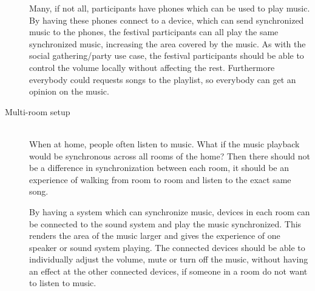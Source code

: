 \begin{description}
        Many, if not all, participants have phones which can be used to play music.
        By having these phones connect to a device, which can send synchronized music to the phones,
        the festival participants can all play the same synchronized music,
        increasing the area covered by the music.
        As with the social gathering/party use case,
        the festival participants should be able to control the volume locally without affecting the rest.
        Furthermore everybody could requests songs to the playlist, so everybody can get an opinion on the music.

    \item[Multi-room setup] \hfill\\
        When at home, people often listen to music.
        What if the music playback would be synchronous across all rooms of the home?
        Then there should not be a difference in synchronization between each room,
        it should be an experience of walking from room to room and listen to the exact same song.

        By having a system which can synchronize music, devices in each room can be connected to the sound system and play the music synchronized.
        This renders the area of the music larger and gives the experience of one speaker or sound system playing.
        The connected devices should be able to individually adjust the volume, mute or turn off the music,
        without having an effect at the other connected devices, if someone in a room do not want to listen to music. 
\end{description}
